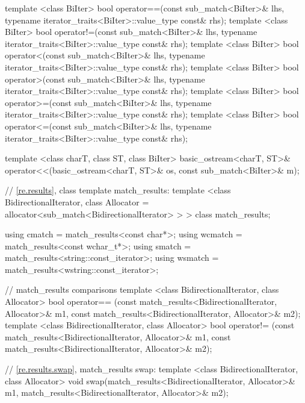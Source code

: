 \begin{codeblock}
{  template <class BiIter> 
    bool operator==(const sub_match<BiIter>& lhs, 
                    typename iterator_traits<BiIter>::value_type const& rhs); 
  template <class BiIter> 
    bool operator!=(const sub_match<BiIter>& lhs, 
                    typename iterator_traits<BiIter>::value_type const& rhs); 
  template <class BiIter> 
    bool operator<(const sub_match<BiIter>& lhs, 
                   typename iterator_traits<BiIter>::value_type const& rhs); 
  template <class BiIter> 
    bool operator>(const sub_match<BiIter>& lhs, 
                   typename iterator_traits<BiIter>::value_type const& rhs); 
  template <class BiIter> 
    bool operator>=(const sub_match<BiIter>& lhs, 
                    typename iterator_traits<BiIter>::value_type const& rhs); 
  template <class BiIter> 
    bool operator<=(const sub_match<BiIter>& lhs, 
                    typename iterator_traits<BiIter>::value_type const& rhs); 

  template <class charT, class ST, class BiIter>
    basic_ostream<charT, ST>&
    operator<<(basic_ostream<charT, ST>& os, const sub_match<BiIter>& m);

  // \ref{re.results}, class template match_results:
  template <class BidirectionalIterator,
            class Allocator = allocator<sub_match<BidirectionalIterator> > >
    class match_results;

  using cmatch  = match_results<const char*>;
  using wcmatch = match_results<const wchar_t*>;
  using smatch  = match_results<string::const_iterator>;
  using wsmatch = match_results<wstring::const_iterator>;

  // match_results comparisons
  template <class BidirectionalIterator, class Allocator>
    bool operator== (const match_results<BidirectionalIterator, Allocator>& m1,
                     const match_results<BidirectionalIterator, Allocator>& m2);
  template <class BidirectionalIterator, class Allocator>
    bool operator!= (const match_results<BidirectionalIterator, Allocator>& m1,
                     const match_results<BidirectionalIterator, Allocator>& m2);

  // \ref{re.results.swap}, match_results swap:
  template <class BidirectionalIterator, class Allocator>
    void swap(match_results<BidirectionalIterator, Allocator>& m1,
              match_results<BidirectionalIterator, Allocator>& m2);

}
\end{codeblock}
